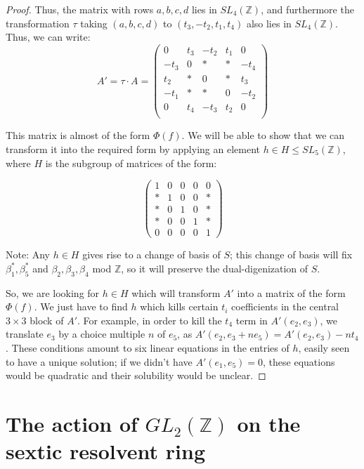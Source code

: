 \documentclass{report}
\begin{document}
\begin{proof}
Thus, the matrix with rows $a,b,c,d$ lies in $SL_4(\mathbb{Z})$, and furthermore the transformation $\tau$ taking $(a,b,c,d)$ to $(t_3, - t_2, t_1, t_4)$ also lies in $SL_4(\mathbb{Z})$.  Thus, we can write:
\begin{equation} A' = \tau \cdot A = 
\begin{pmatrix}
0 & t_3 & - t_2 & t_1 & 0 \\
- t_3 & 0 & * & * & - t_4 \\
t_2 & * & 0 & * & t_3 \\
- t_1 & * & * & 0 & - t_2 \\
0 & t_4 & - t_3 & t_2 & 0 \\
\end{pmatrix}
\end{equation}

This matrix is almost of the form $\Phi(f)$.  We will be able to show that we can transform it into the required form by applying an element $h \in H \leq SL_5(\mathbb{Z})$, where $H$ is the subgroup of matrices of the form:

\begin{equation}
\begin{pmatrix}
1 & 0 & 0 & 0 & 0 \\
* & 1 & 0 & 0 & * \\
* & 0 & 1 & 0 & * \\
* & 0 & 0 & 1 & * \\
0 & 0 & 0 & 0 & 1
\end{pmatrix}
\end{equation}

Note: Any $h \in H$ gives rise to a change of basis of $S$; this change of basis will fix $\beta_1^*, \beta_5^*$ and $\beta_2, \beta_3, \beta_4$ mod $\mathbb{Z}$, so it will preserve the dual-digenization of $S$.

So, we are looking for $h \in H$ which will transform $A'$ into a matrix of the form $\Phi(f)$.  We just have to find $h$ which kills certain $t_i$ coefficients in the central $3 \times 3$ block of $A'$.  For example, in order to kill the $t_4$ term in $A'(e_2, e_3)$, we translate $e_3$ by a choice multiple $n$ of $e_5$, as $A'(e_2, e_3 + n e_5) = A'(e_2, e_3) - n t_4$.  These conditions amount to six linear equations in the entries of $h$, easily seen to have a unique solution; if we didn't have $A'(e_1,e_5) = 0$, these equations would be quadratic and their solubility would be unclear.
\end{proof}

\section{The action of $GL_2(\mathbb{Z})$ on the sextic resolvent ring}
\end{document}
